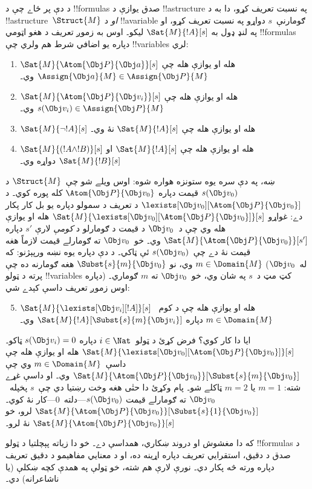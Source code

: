 \documentclass[../../../include/open-logic-section]{subfiles}
\begin{document}
د دې پر ځاے چې د !!{formula}s صدق يوازې د !!a{structure} په نسبت
تعريف کړو، دا به د !!a{structure}~$\Struct{M}$ \emph{او} د
!!a{variable} ګومارنې~$s$ دواړو په نسبت تعريف کړو، او په لنډ ډول به
$\Sat{M}{!A}[s]$ ليکو۔ اوس به زموږ تعريف د هغو اټومي !!{formula}s
دپاره يو اضافي شرط هم ولري چې !!{variable}s لري:
\begin{enumerate}
  \item $\Sat{M}{\Atom{\Obj P}{\Obj a}}[s]$ هله او يوازې هله چې
  $\Assign{\Obj a}{M} \in \Assign{\Obj P}{M}$ وي۔
  \item $\Sat{M}{\Atom{\Obj P}{\Obj v_i}}[s]$ هله او يوازې هله چې
  $s(\Obj v_i) \in \Assign{\Obj P}{M}$ وي۔
  \item $\Sat{M}{\lnot !A}[s]$ هله او يوازې هله چې
  $\Sat{M}{!A}[s]$ نۀ وي۔
  \item $\Sat{M}{(!A \land !B)}[s]$ هله او يوازې هله چې
  $\Sat{M}{!A}[s]$ او $\Sat{M}{!B}[s]$ دواړه وي۔
\end{enumerate}
ښه، په دې سره يوه ستونزه هواره شوه: اوس ويلے شو چې~$\Struct{M}$ د
$s(\Obj v_0)$ قيمت دپاره $\Atom{\Obj P}{\Obj v_0}$ کله پوره کوي۔
د $\lexists[\Obj v_0][\Atom{\Obj P}{\Obj v_0}]$ د تعريف د سمولو
دپاره يو بل کار پکار دے: غواړو
$\Sat{M}{\lexists[\Obj v_0][\Atom{\Obj P}{\Obj v_0}]}[s]$ هله او
يوازې هله وي چې د~$\Obj v_0$ د قيمت د ګومارلو د \emph{کومې} لارې
$s'$ دپاره $\Sat{M}{\Atom{\Obj P}{\Obj v_0}}[s']$ وي۔ خو~$\Obj v_0$
ته ګومارلے قيمت لازماً هغه قيمت نۀ دے چې~$s(\Obj v_0)$ ئې ټاکي۔
د دې دپاره يوه نښه ورپېژنو: که $m \in \Domain{M}$ وي، نو
$\Subst{s}{m}{\Obj v_0}$ هغه ګومارنه ده چې (له~$\Obj v_0$ پرته د
ټولو !!{variable}s دپاره) کټ مټ د~$s$ په شان وي، خو~$\Obj v_0$ ته
$m$ ګوماري۔ اوس زموږ تعريف داسې کېدے شي:
\begin{enumerate}\setcounter{enumi}{4}
  \item $\Sat{M}{\lexists[\Obj v_i][!A]}[s]$ هله او يوازې هله چې
  د کوم~$m \in \Domain{M}$ دپاره
  $\Sat{M}{!A}[\Subst{s}{m}{\Obj v_i}]$ وي۔
\end{enumerate}
ايا دا کار کوي؟ فرض کړئ د ټولو~$i \in \Nat$ دپاره
$s(\Obj v_i) = 0$ ټاکو۔
$\Sat{M}{\lexists[\Obj v_0][\Atom{\Obj P}{\Obj v_0}]}[s]$ هله او
يوازې هله چې داسې~$m \in \Domain{M}$ وي چې
$\Sat{M}{\Atom{\Obj P}{\Obj v_0}}[\Subst{s}{m}{\Obj v_0}]$ وي۔ او
داسې غړے شته: $m = 1$ يا $m = 2$ ټاکلے شو۔ پام وکړئ دا حتٰی هغه
وخت رښتيا دي چې~$s$ پخپله~$\Obj v_0$ ته ګومارلے قيمت
$s(\Obj v_0)$---دلته~$0$---کار نۀ کوي۔
$\Sat{M}{\Atom{\Obj P}{\Obj v_0}}[\Subst{s}{1}{\Obj v_0}]$ لرو، خو
$\Sat{M}{\Atom{\Obj P}{\Obj v_0}}[s]$ نۀ لرو۔

که دا مغشوش او دروند ښکاري، همداسې دے۔ خو دا زياته پېچلتيا د ټولو
!!{formula}s د صدق د دقيق، استقرايي تعريف دپاره اړينه ده، او د
معنايي مفاهيمو د دقيق تعريف دپاره ورته څه پکار دي۔ نورې لارې هم
شته، خو ټولې په همدې کچه ښکلې (يا ناشاعرانه) دي۔
\end{document}
